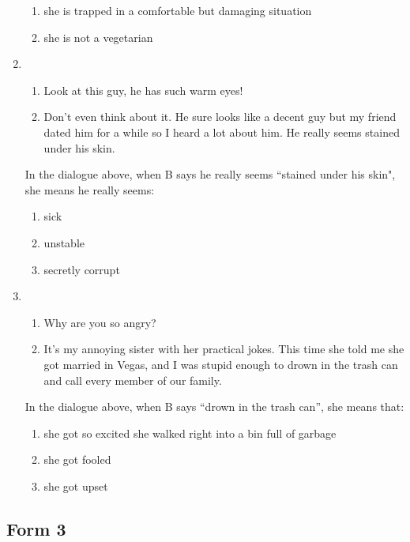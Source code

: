 \documentclass[output=paper]{langsci/langscibook}
\begin{document}
\begin{paperappendix}
\begin{enumerate}
\begin{enumerate}[label=\arabic*.,noitemsep]
        \item she is trapped in a comfortable but damaging situation
        \item she is not a vegetarian
        \end{enumerate}
    \item
       \begin{enumerate}[nosep,label=\Alph*:]
        \item Look at this guy, he has such warm eyes!
        \item Don't even think about it. He sure looks like a decent guy but my friend dated him for a while so I heard a lot about him. He really seems stained under his skin.
        \end{enumerate}
        In the dialogue above, when B says he really seems “stained under his skin", she means he really seems:
        \begin{enumerate}[label=\arabic*.,noitemsep]
        \item sick
        \item unstable
        \item secretly corrupt
        \end{enumerate}
    \item
       \begin{enumerate}[nosep,label=\Alph*:]
        \item Why are you so angry?
        \item It's my annoying sister with her practical jokes. This time she told me she got married in Vegas, and I was stupid enough to drown in the trash can and call every member of our family.
        \end{enumerate}
        In the dialogue above, when B says \enquote{drown in the trash can}, she means that:
        \begin{enumerate}[label=\arabic*.,noitemsep]
        \item she got so excited she walked right into a bin full of garbage
        \item she got  fooled
        \item she got upset
        \end{enumerate}
\end{enumerate}

\subsection{Form 3}

\end{paperappendix}
\end{document}
